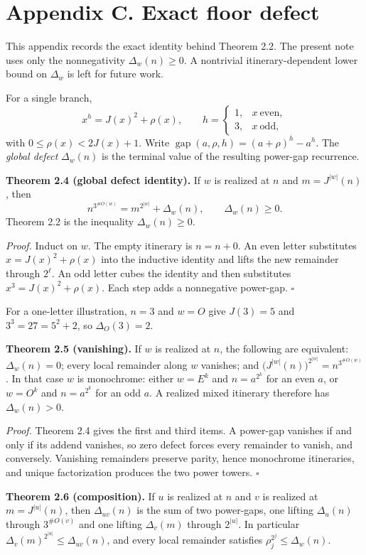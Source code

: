 \documentclass[12pt]{article}
\begin{document}
\section{Appendix C. Exact floor
defect}\label{appendix-c.-exact-floor-defect}

This appendix records the exact identity behind Theorem 2.2. The present
note uses only the nonnegativity \(\Delta_w(n)\ge0\). A nontrivial
itinerary-dependent lower bound on \(\Delta_w\) is left for future work.

For a single branch, \[
x^h=J(x)^2+\rho(x),\qquad
h=\begin{cases}1,&x\ \text{even},\\3,&x\ \text{odd},\end{cases}
\] with \(0\le\rho(x)<2J(x)+1\). Write
\(\operatorname{gap}(a,\rho,h)=(a+\rho)^h-a^h\). The \emph{global
defect} \(\Delta_w(n)\) is the terminal value of the resulting power-gap
recurrence.

\textbf{Theorem 2.4 (global defect identity).} If \(w\) is realized at
\(n\) and \(m=J^{|w|}(n)\), then \[
n^{3^{\#O(w)}}=m^{2^{|w|}}+\Delta_w(n),\qquad\Delta_w(n)\ge0.
\] Theorem 2.2 is the inequality \(\Delta_w(n)\ge0\).

\emph{Proof.} Induct on \(w\). The empty itinerary is \(n=n+0\). An even
letter substitutes \(x=J(x)^2+\rho(x)\) into the inductive identity and
lifts the new remainder through \(2^\ell\). An odd letter cubes the
identity and then substitutes \(x^3=J(x)^2+\rho(x)\). Each step adds a
nonnegative power-gap. \(\square\)

For a one-letter illustration, \(n=3\) and \(w=O\) give \(J(3)=5\) and
\(3^3=27=5^2+2\), so \(\Delta_O(3)=2\).

\textbf{Theorem 2.5 (vanishing).} If \(w\) is realized at \(n\), the
following are equivalent: \(\Delta_w(n)=0\); every local remainder along
\(w\) vanishes; and \(\bigl(J^{|w|}(n)\bigr)^{2^{|w|}}=n^{3^{\#O(w)}}\).
In that case \(w\) is monochrome: either \(w=E^k\) and \(n=a^{2^k}\) for
an even \(a\), or \(w=O^k\) and \(n=a^{2^k}\) for an odd \(a\). A
realized mixed itinerary therefore has \(\Delta_w(n)>0\).

\emph{Proof.} Theorem 2.4 gives the first and third items. A power-gap
vanishes if and only if its addend vanishes, so zero defect forces every
remainder to vanish, and conversely. Vanishing remainders preserve
parity, hence monochrome itineraries, and unique factorization produces
the two power towers. \(\square\)

\textbf{Theorem 2.6 (composition).} If \(u\) is realized at \(n\) and
\(v\) is realized at \(m=J^{|u|}(n)\), then \(\Delta_{uv}(n)\) is the
sum of two power-gaps, one lifting \(\Delta_u(n)\) through
\(3^{\#O(v)}\) and one lifting \(\Delta_v(m)\) through \(2^{|u|}\). In
particular \(\Delta_v(m)^{2^{|u|}}\le\Delta_{uv}(n)\), and every local
remainder satisfies \(\rho_j^{2^j}\le\Delta_w(n)\).
\end{document}
